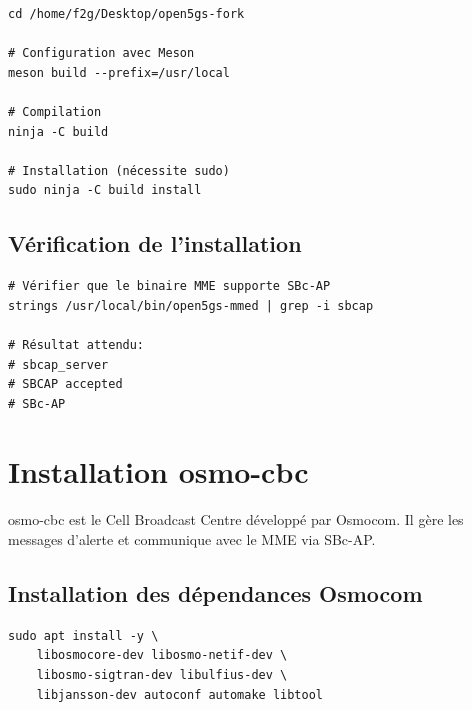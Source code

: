 \documentclass[11pt,a4paper]{article}
\begin{document}
\begin{cmdbox}
\begin{lstlisting}[style=bashstyle]
cd /home/f2g/Desktop/open5gs-fork

# Configuration avec Meson
meson build --prefix=/usr/local

# Compilation
ninja -C build

# Installation (nécessite sudo)
sudo ninja -C build install
\end{lstlisting}
\end{cmdbox}

\subsection{Vérification de l'installation}

\begin{successbox}
\begin{lstlisting}[style=bashstyle]
# Vérifier que le binaire MME supporte SBc-AP
strings /usr/local/bin/open5gs-mmed | grep -i sbcap

# Résultat attendu:
# sbcap_server
# SBCAP accepted
# SBc-AP
\end{lstlisting}
\end{successbox}

\newpage

\section{Installation osmo-cbc}

osmo-cbc est le Cell Broadcast Centre développé par Osmocom. Il gère les messages d'alerte et communique avec le MME via SBc-AP.

\subsection{Installation des dépendances Osmocom}

\begin{cmdbox}
\begin{lstlisting}[style=bashstyle]
sudo apt install -y \
    libosmocore-dev libosmo-netif-dev \
    libosmo-sigtran-dev libulfius-dev \
    libjansson-dev autoconf automake libtool
\end{lstlisting}
\end{cmdbox}
\end{document}
